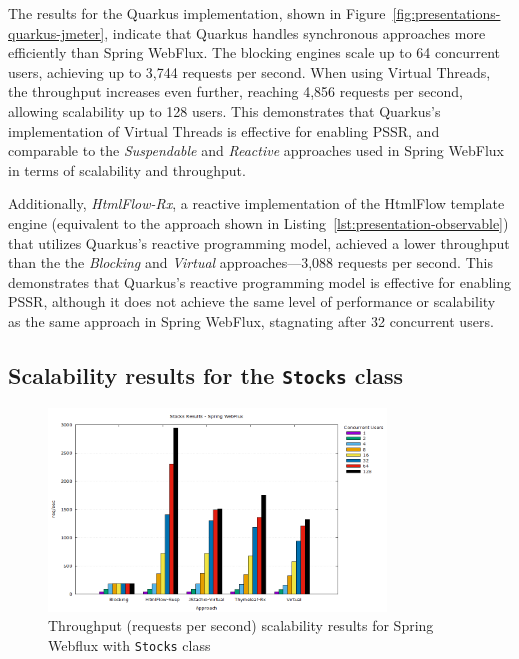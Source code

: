 The results for the Quarkus implementation, shown in
Figure~\ref{fig:presentations-quarkus-jmeter}, indicate that Quarkus handles
synchronous approaches more efficiently than Spring WebFlux. The blocking
engines scale up to 64 concurrent users, achieving up to 3,744 requests per
second. When using Virtual Threads, the throughput increases even further,
reaching 4,856 requests per second, allowing scalability up to 128 users. This
demonstrates that Quarkus's implementation of Virtual Threads is effective for
enabling PSSR\@, and comparable to the \textit{Suspendable} and
\textit{Reactive} approaches used in Spring WebFlux in terms of scalability and
throughput.

Additionally, \textit{HtmlFlow-Rx}, a reactive implementation of the HtmlFlow
template engine (equivalent to the approach shown in
Listing~\ref{lst:presentation-observable}) that utilizes Quarkus's reactive
programming model, achieved a lower throughput than the the \textit{Blocking}
and \textit{Virtual} approaches—3,088 requests per second. This demonstrates
that Quarkus's reactive programming model is effective for enabling PSSR\@,
although it does not achieve the same level of performance or scalability as
the same approach in Spring WebFlux, stagnating after 32 concurrent users.

\subsection{Scalability results for the \texttt{Stocks} class}

\begin{figure}[h]
     \centering
     \includegraphics[width=0.8\textwidth]{./Graphs/stocks-webflux-jmeter.png}
     \caption{Throughput (requests per second) scalability results for Spring Webflux with \texttt{Stocks} class}\label{fig:stocks-webflux-jmeter}
\end{figure}

